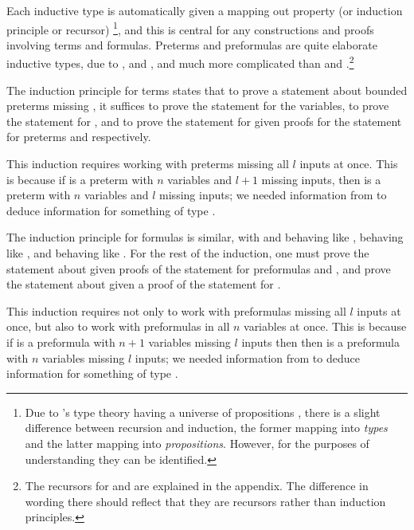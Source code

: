 \begin{rmk}
  Each inductive type is automatically given a mapping out property (or induction principle or recursor)
  \footnote{
    Due to 's type theory having a universe of propositions ,
    there is a slight difference between recursion and induction,
    the former mapping into \textit{types} and the latter mapping into \textit{propositions}.
    However, for the purposes of understanding they can be identified.
  },
  and this is central for any constructions and proofs involving terms and formulas.
  Preterms and preformulas are quite elaborate inductive types,
  due to ,  and ,
  and much more complicated than  and .\footnote{
    The recursors for  and 
    are explained in the appendix.
    The difference in wording there should reflect that they are recursors
    rather than induction principles.
  }

  The induction principle for terms states that to prove a statement about
  bounded preterms missing ,
  it suffices to prove the statement for the variables,
  to prove the statement for ,
  and to prove the statement for  given proofs for the statement
  for preterms  and  respectively.

  This induction requires working with preterms missing all $l$ inputs at once.
  This is because if  is a preterm with $n$ variables and $l + 1$ missing inputs,
  then  is a preterm with $n$ variables and $l$ missing inputs;
  we needed information from  to deduce
  information for something of type .

  The induction principle for formulas is similar,
  with  and  behaving like ,
   behaving like ,
  and  behaving like .
  For the rest of the induction,
  one must prove the statement about  given
  proofs of the statement for preformulas  and ,
  and prove the statement about  given a proof
  of the statement for .

  This induction requires not only to work with preformulas missing all $l$ inputs at once,
  but also to work with preformulas in all $n$ variables at once.
  This is because if  is a preformula with $n + 1$ variables missing $l$ inputs then
  then  is a preformula with $n$ variables missing $l$ inputs;
  we needed information from  to deduce information
  for something of type .

\end{rmk}

